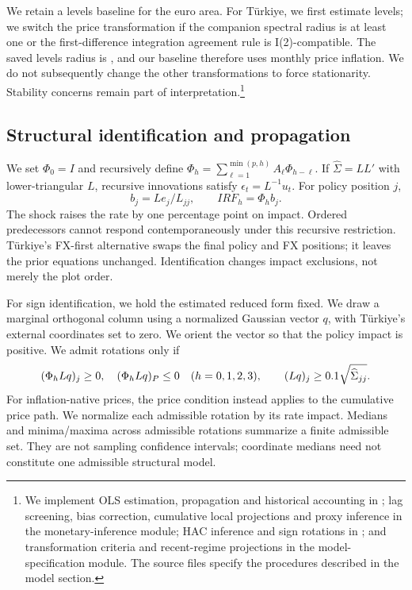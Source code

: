 We retain a levels baseline for the euro area. For Türkiye, we first estimate levels; we switch the price transformation if the companion spectral radius is at least one or the first-difference integration agreement rule is I(2)-compatible. The saved levels radius is \TRLevelsRadius{}, and our baseline therefore uses monthly price inflation. We do not subsequently change the other transformations to force stationarity. Stability concerns remain part of interpretation.\footnote{We implement OLS estimation, propagation and historical accounting in ; lag screening, bias correction, cumulative local projections and proxy inference in the monetary-inference module; HAC inference and sign rotations in ; and transformation criteria and recent-regime projections in the model-specification module. The source files specify the procedures described in the model section.}
\subsection{Structural identification and propagation}
We set $\Phi_0=I$ and recursively define $\Phi_h=\sum_{\ell=1}^{\min(p, h)}A_\ell\Phi_{h-\ell}$. If $\widehat\Sigma=LL'$ with lower-triangular $L$, recursive innovations satisfy $\epsilon_t=L^{-1}u_t$. For policy position $j$,
\begin{equation}
 b_j=Le_j/L_{jj},\qquad IRF_h=\Phi_h b_j.
\end{equation}
The shock raises the rate by one percentage point on impact. Ordered predecessors cannot respond contemporaneously under this recursive restriction. Türkiye's FX-first alternative swaps the final policy and FX positions; it leaves the prior equations unchanged. Identification changes impact exclusions, not merely the plot order.

For sign identification, we hold the estimated reduced form fixed. We draw a marginal orthogonal column using a normalized Gaussian vector $q$, with Türkiye's external coordinates set to zero. We orient the vector so that the policy impact is positive. We admit rotations only if
\begin{equation}
 (\Phi_hLq)_j\geq0,\quad (\Phi_hLq)_P\leq0\quad(h=0,1,2,3),
 \qquad (Lq)_j\geq0.1\sqrt{\widehat\Sigma_{jj}}.
\end{equation}
For inflation-native prices, the price condition instead applies to the cumulative price path. We normalize each admissible rotation by its rate impact. Medians and minima/maxima across admissible rotations summarize a finite admissible set. They are not sampling confidence intervals; coordinate medians need not constitute one admissible structural model.


